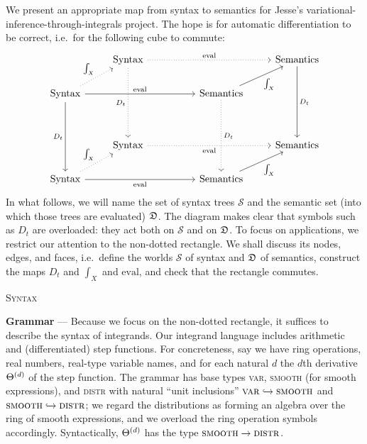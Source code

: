     We present an appropriate map from syntax to semantics for Jesse's
    variational-inference-through-integrals project.  The hope is for automatic
    differentiation to be correct, i.e.\ for the following cube to commute: 
    $$\begin{tikzcd}
                                                               & {\rm Syntax} \arrow[ddd, "D_t"', dotted] \arrow[rrr, "{\rm eval}", dotted] &  &                                        & {\rm Semantics} \arrow[ddd, "D_t"] \\
    {\rm Syntax} \arrow[ddd, "D_t"'] \arrow[rrr, "{\rm eval}"] \arrow[ru, "\int_X", dotted] &                                          &  & {\rm Semantics} \arrow[ddd, "D_t", dotted] \arrow[ru, "\int_X"'] &                      \\
                                                               &                                          &  &                                        &                      \\
                                                               & {\rm Syntax} \arrow[rrr, "{\rm eval}"', dotted]                    &  &                                        & {\rm Semantics}                    \\
    {\rm Syntax} \arrow[rrr, "{\rm eval}"'] \arrow[ru, "\int_X", dotted]                    &                                          &  & {\rm Semantics} \arrow[ru, "\int_X"']                    &
    \end{tikzcd}$$
    In what follows, we will name the set of syntax trees $\mathcal S$ and
    the semantic set (into which those trees are evaluated) $\frak D$.
    The diagram makes clear that symbols such as $D_t$ are overloaded: they
    act both on $\mathcal S$ and on $\frak D$.
    To focus on applications, we restrict our attention to the non-dotted
    rectangle.  We shall discuss its nodes, edges, and faces, i.e.\ define
    the worlds $\mathcal S$ of syntax and $\frak D$ of semantics, construct the
    maps $D_t$ and $\int_X$ and $\text{eval}$, and check that the rectangle
    commutes. 
    
\begin{center}\large\textsc{Syntax}\end{center}
    
    \noindent\textbf{Grammar} ---
    Because we focus on the non-dotted rectangle, it suffices to describe the
    syntax of integrands.
    Our integrand language includes arithmetic and (differentiated) step
    functions.  For concreteness, say we have ring operations, real numbers,
    real-type variable names, and for each natural $d$ the $d$th derivative
    $\Theta^{(d)}$ of the step function.
    The grammar has base types \textsc{var},
    \textsc{smooth} (for smooth expressions), and \textsc{distr} with
    natural ``unit inclusions'' $\text{\textsc{var}}\hookrightarrow
    \text{\textsc{smooth}}$ and $\text{\textsc{smooth}}\hookrightarrow
    \text{\textsc{distr}}$; we regard the distributions as forming
    an algebra over the ring of smooth expressions, and we overload the
    ring operation symbols accordingly.  Syntactically, $\Theta^{(d)}$ has the type
    $\text{\textsc{smooth}}\to \text{\textsc{distr}}$.

